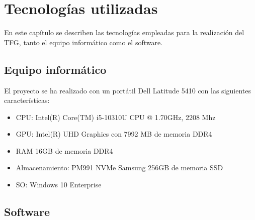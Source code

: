 \chapter{Tecnologías utilizadas}
\label{chap:tecnologías}

\lettrine{E}{}n este capítulo se describen las tecnologías empleadas para la realización del \acrshort{TFG}, tanto el equipo informático como el software.


\section{Equipo informático}
\label{sec:mostra}

El proyecto se ha realizado con un portátil Dell Latitude 5410 con las siguientes características:

\begin{itemize}
    \item \acrfull{CPU}: Intel(R) Core(TM) i5-10310U CPU @ 1.70GHz, 2208 Mhz
    \item \acrfull{GPU}: Intel(R) UHD Graphics con 7992 MB de memoria DDR4
    \item \acrfull{RAM} 16GB de memoria DDR4
    \item Almacenamiento: PM991 NVMe Samsung 256GB de memoria \acrfull{SSD}
    \item \acrfull{SO}: Windows 10 Enterprise
\end{itemize}

\section{Software}
\label{sec:mostra}

